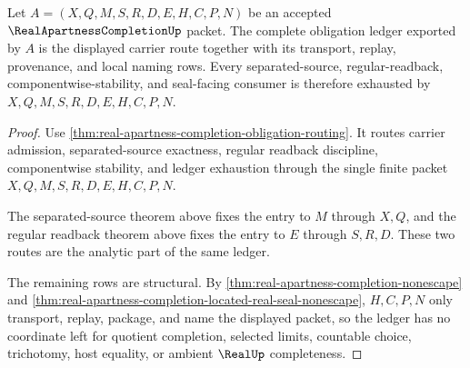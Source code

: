 \begin{theorem}
\label{thm:real-apartness-completion-ledger-exhaustion}
Let $A=(X,Q,M,S,R,D,E,H,C,P,N)$ be an accepted $\RealApartnessCompletionUp$ packet. The complete obligation ledger exported by $A$ is the displayed carrier route together with its transport, replay, provenance, and local naming rows. Every separated-source, regular-readback, componentwise-stability, and seal-facing consumer is therefore exhausted by $X,Q,M,S,R,D,E,H,C,P,N$.
\end{theorem}
\begin{proof}
Use \autoref{thm:real-apartness-completion-obligation-routing}. It routes carrier admission, separated-source exactness, regular readback discipline, componentwise stability, and ledger exhaustion through the single finite packet $X,Q,M,S,R,D,E,H,C,P,N$.

The separated-source theorem above fixes the entry to $M$ through $X,Q$, and the regular readback theorem above fixes the entry to $E$ through $S,R,D$. These two routes are the analytic part of the same ledger.

The remaining rows are structural. By \autoref{thm:real-apartness-completion-nonescape} and \autoref{thm:real-apartness-completion-located-real-seal-nonescape}, $H,C,P,N$ only transport, replay, package, and name the displayed packet, so the ledger has no coordinate left for quotient completion, selected limits, countable choice, trichotomy, host equality, or ambient $\RealUp$ completeness.
\end{proof}


